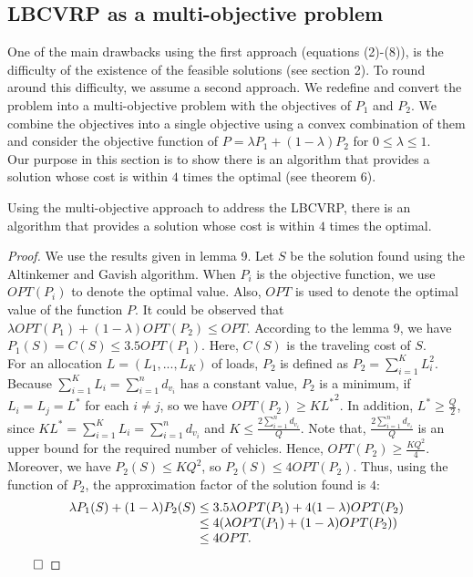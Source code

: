\subsection{LBCVRP as a multi-objective problem}
\noindent One of the main drawbacks using the first approach (equations (2)-(8)), is the difficulty of the existence of the feasible solutions (see section 2). To round around this difficulty, we assume a second approach. We redefine and convert the problem into a multi-objective problem with the objectives of $P_1$ and $P_2$. We combine the objectives into a single objective using a convex combination of them and consider the objective function of $P = \lambda {P_1} + (1 - \lambda ){P_2}$ for $0 \le \lambda  \le 1$. \\
\indent Our purpose in this section is to show there is an algorithm that provides a solution whose cost is within $4$ times the optimal (see theorem 6).
\begin{theorem}
Using the multi-objective approach to address the LBCVRP, there is an algorithm that provides a solution whose cost is within $4$ times the optimal.
\end{theorem}
\begin{proof}
\indent We use the results given in lemma 9. Let $S$ be the solution found using the Altinkemer and Gavish algorithm. When $P_i$ is the objective function, we use $OPT(P_i)$ to denote the optimal value. Also, $OPT$ is used to denote the optimal value of the function $P$. It could be observed that $\lambda OPT({P_1}) + (1 - \lambda )OPT({P_2}) \le OPT$. According to the lemma 9, we have $P_1(S)=C(S) \le 3.5 OPT({P_1})$. Here, $C(S)$ is the traveling cost of $S$.\\ 
\indent  For an allocation $L = ({L_1},...,{L_K})$ of loads, ${P_2}$ is defined as ${P_2} = \sum\nolimits_{i = 1}^K {L_i^2} $. Because $\sum\nolimits_{i = 1}^K {L_i}  = \sum\nolimits_{i = 1}^n {d_{v_i}}$ has a constant value, ${P_2}$ is a minimum, if ${L_i} = {L_j} = {L^*}$ for each $i \ne j$, so we have  $OPT(P_2) \ge K{L^*}^2$. In addition, ${L^*} \ge \frac{Q}{2}$, since $K{L^*} = \sum\nolimits_{i = 1}^K {{L_i}}  = \sum\nolimits_{i = 1}^n d_{v_i} $ and $K \le \frac{2\sum\nolimits_{i = 1}^n d_{v_i}}{Q}$. Note that, $\frac{2\sum\nolimits_{i = 1}^n d_{v_i}}{Q}$ is an upper bound for the required number of vehicles. Hence, $OPT({P_2}) \ge \frac{K{Q^2}}{4}$. Moreover, we have  ${P_2}(S) \le K{Q^2}$, so ${P_2}(S) \le 4OPT({P_2})$. Thus, using the function of ${P_2}$, the approximation factor of the solution found is $4$: 
$$\begin{array}{l}
\lambda {P_1}(S) + (1 - \lambda ) P_2(S) \le 3.5\lambda OPT({P_1}) + 4(1 - \lambda )OPT(P_2)\\
\hspace{3.6cm} \le 4(\lambda OPT({P_1}) + (1 - \lambda )OPT(P_2))\\
\hspace{3.6cm} \le 4OPT. 
\end{array}$$
$ \qed$
\end{proof}
